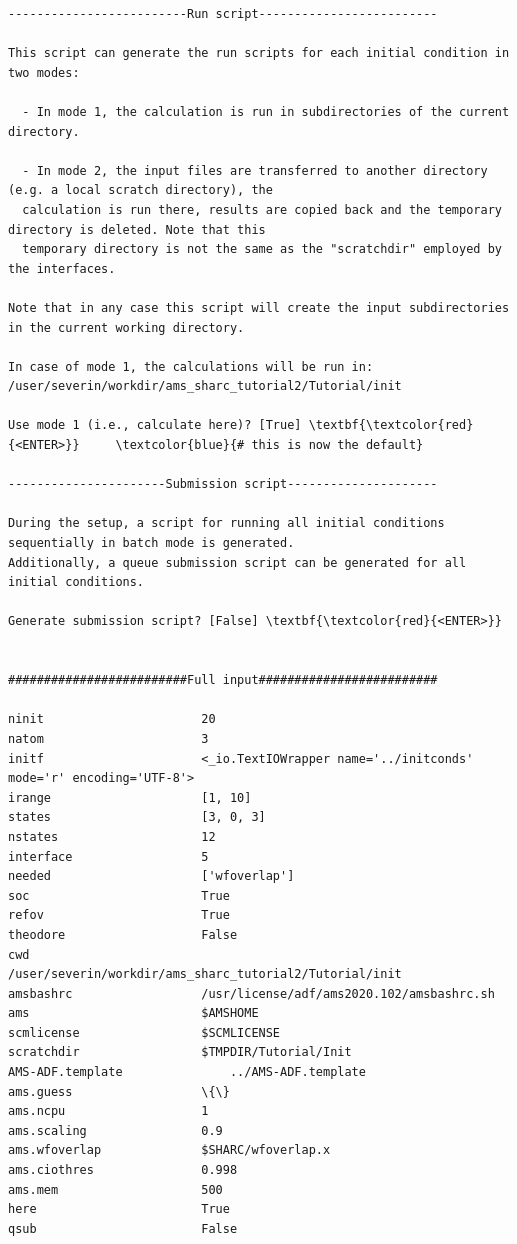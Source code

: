\documentclass[a4paper,11pt,DIV=15,openany]{scrbook}
\begin{document}
\begin{oframed}
\begin{Verbatim}[commandchars=\\\{\}]
-------------------------Run script-------------------------

This script can generate the run scripts for each initial condition in two modes:

  - In mode 1, the calculation is run in subdirectories of the current directory.

  - In mode 2, the input files are transferred to another directory (e.g. a local scratch directory), the 
  calculation is run there, results are copied back and the temporary directory is deleted. Note that this 
  temporary directory is not the same as the "scratchdir" employed by the interfaces.

Note that in any case this script will create the input subdirectories in the current working directory.

In case of mode 1, the calculations will be run in:
/user/severin/workdir/ams_sharc_tutorial2/Tutorial/init

Use mode 1 (i.e., calculate here)? [True] \textbf{\textcolor{red}{<ENTER>}}     \textcolor{blue}{# this is now the default}

----------------------Submission script---------------------

During the setup, a script for running all initial conditions sequentially in batch mode is generated. 
Additionally, a queue submission script can be generated for all initial conditions.

Generate submission script? [False] \textbf{\textcolor{red}{<ENTER>}}


#########################Full input#########################

ninit                      20
natom                      3
initf                      <_io.TextIOWrapper name='../initconds' mode='r' encoding='UTF-8'>
irange                     [1, 10]
states                     [3, 0, 3]
nstates                    12
interface                  5
needed                     ['wfoverlap']
soc                        True
refov                      True
theodore                   False
cwd                        /user/severin/workdir/ams_sharc_tutorial2/Tutorial/init
amsbashrc                  /usr/license/adf/ams2020.102/amsbashrc.sh
ams                        $AMSHOME
scmlicense                 $SCMLICENSE
scratchdir                 $TMPDIR/Tutorial/Init
AMS-ADF.template               ../AMS-ADF.template
ams.guess                  \{\}
ams.ncpu                   1
ams.scaling                0.9
ams.wfoverlap              $SHARC/wfoverlap.x
ams.ciothres               0.998
ams.mem                    500
here                       True
qsub                       False


\end{Verbatim}
\end{oframed}
\end{document}
